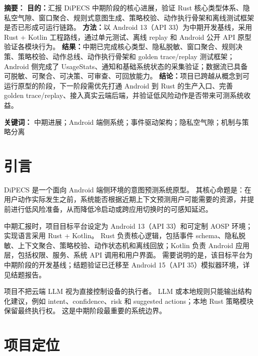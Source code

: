 \documentclass[12pt,a4paper]{article}
\begin{document}
\makecover
\clearpage
{}

{\hypersetup{linkcolor=black}\tableofcontents}
\newpage

\begin{dipecsabstract}
\noindent\textbf{ 摘要：}
\textbf{目的：}汇报 DiPECS 中期阶段的核心进展，验证 Rust 核心类型体系、隐私空气隙、窗口聚合、规则式意图生成、策略校验、动作执行骨架和离线测试框架是否已形成可运行链路。
\textbf{方法：}以 Android 13（API 33）为中期开发基线，采用 Rust + Kotlin 工程路线，通过单元测试、离线 replay 和 Android 公开 API 原型验证各模块行为。
\textbf{结果：}中期已完成核心类型、隐私脱敏、窗口聚合、规则决策、策略校验、动作总线、动作执行骨架和 golden trace/replay 测试框架；Android 侧完成了 UsageStats、通知和基础系统状态的采集验证；数据流已具备可脱敏、可聚合、可决策、可审查、可回放能力。
\textbf{结论：}项目已跨越从概念到可运行原型的阶段，下一阶段需优先打通 Android 到 Rust 的生产入口、完善 golden trace/replay、接入真实云端后端，并验证低风险动作是否带来可测系统收益。

\vspace{0.5em}
\noindent\textbf{ 关键词：} 中期进展；Android 端侧系统；事件驱动架构；隐私空气隙；机制与策略分离
\end{dipecsabstract}

\section{引言}\label{sec:intro}

DiPECS 是一个面向 Android 端侧环境的意图预测系统原型。
其核心命题是：在用户动作实际发生之前，系统能否根据近期上下文预测用户可能需要的资源，并提前进行低风险准备，从而降低冷启动或跨应用切换时的可感知延迟。

中期汇报时，项目目标平台设定为 Android 13（API 33）和可定制 AOSP 环境；实现语言采用 Rust + Kotlin。
Rust 负责核心逻辑，包括事件 schema、隐私脱敏、上下文聚合、策略校验、动作状态机和离线回放；Kotlin 负责 Android 应用层，包括权限、服务、系统 API 调用和用户界面。
需要说明的是，该目标平台为中期阶段的开发基线；结题验证已迁移至 Android 15（API 35）模拟器环境，详见结题报告。

项目不把云端 LLM 视为直接控制设备的执行者。
LLM 或本地规则只能输出结构化建议，例如 intent、confidence、risk 和 suggested actions；本地 Rust 策略模块保留最终执行权。
这是中期阶段最重要的系统边界。

\section{项目定位}\label{sec:positioning}
\end{document}
